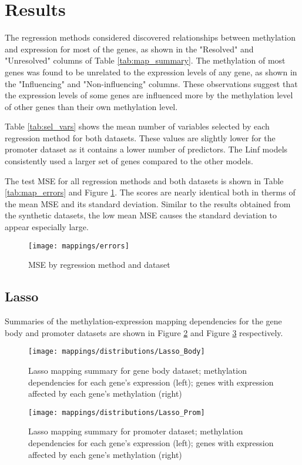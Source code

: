 \section{Results}
The regression methods considered discovered relationships between methylation and expression for most of the genes, as shown in the "Resolved" and "Unresolved" columns of Table \ref{tab:map_summary}. The methylation of most genes was found to be unrelated to the expression levels of any gene, as shown in the "Influencing" and "Non-influencing" columns. These observations suggest that the expression levels of some genes are influenced more by the methylation level of other genes than their own methylation level.


Table \ref{tab:sel_vars} shows the mean number of variables selected by each regression method for both datasets. These values are slightly lower for the promoter dataset as it contains a lower number of predictors. The Linf models consistently used a larger set of genes compared to the other models.

\pagebreak

The test MSE for all regression methods and both datasets is shown in Table \ref{tab:map_errors} and Figure \ref{fig:map_errors}. The scores are nearly identical both in therms of the mean MSE and its standard deviation. Similar to the results obtained from the synthetic datasets, the low mean MSE causes the standard deviation to appear especially large.


\begin{figure}[H]
	\centering
	\texttt{[image: mappings/errors]}
	\caption{MSE by regression method and dataset}
	\label{fig:map_errors}
\end{figure}
\pagebreak


\subsection{Lasso}
Summaries of the methylation-expression mapping dependencies for the gene body and promoter datasets are shown in Figure \ref{fig:map_body_lasso} and Figure \ref{fig:map_prom_lasso} respectively.
\begin{figure}[H]
	\centering
	\texttt{[image: mappings/distributions/Lasso\_Body]}
	\caption{Lasso mapping summary for gene body dataset; methylation dependencies for each gene's expression (left); genes with expression affected by each gene's methylation (right)}
	\label{fig:map_body_lasso}
\end{figure}
\begin{figure}[H]
	\centering
	\texttt{[image: mappings/distributions/Lasso\_Prom]}
	\caption{Lasso mapping summary for promoter dataset; methylation dependencies for each gene's expression (left); genes with expression affected by each gene's methylation (right)}
	\label{fig:map_prom_lasso}
\end{figure}
\pagebreak


